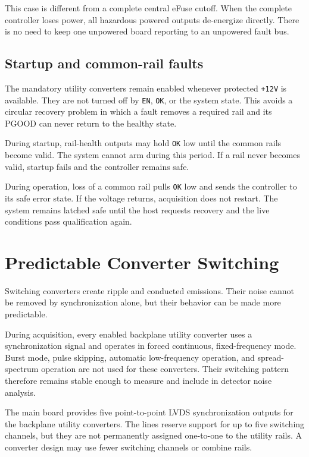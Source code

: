 This case is different from a complete central eFuse cutoff. When the complete controller loses power, all hazardous powered outputs de-energize directly. There is no need to keep one unpowered board reporting to an unpowered fault bus.

\subsection{Startup and common-rail faults}

The mandatory utility converters remain enabled whenever protected \texttt{+12V} is available. They are not turned off by \texttt{EN}, \texttt{OK}, or the system state. This avoids a circular recovery problem in which a fault removes a required rail and its PGOOD can never return to the healthy state.

During startup, rail-health outputs may hold \texttt{OK} low until the common rails become valid. The system cannot arm during this period. If a rail never becomes valid, startup fails and the controller remains safe.

During operation, loss of a common rail pulls \texttt{OK} low and sends the controller to its safe error state. If the voltage returns, acquisition does not restart. The system remains latched safe until the host requests recovery and the live conditions pass qualification again.

\section{Predictable Converter Switching}

Switching converters create ripple and conducted emissions. Their noise cannot be removed by synchronization alone, but their behavior can be made more predictable.

During acquisition, every enabled backplane utility converter uses a synchronization signal and operates in forced continuous, fixed-frequency mode. Burst mode, pulse skipping, automatic low-frequency operation, and spread-spectrum operation are not used for these converters. Their switching pattern therefore remains stable enough to measure and include in detector noise analysis.

The main board provides five point-to-point LVDS synchronization outputs for the backplane utility converters. The lines reserve support for up to five switching channels, but they are not permanently assigned one-to-one to the utility rails. A converter design may use fewer switching channels or combine rails.

